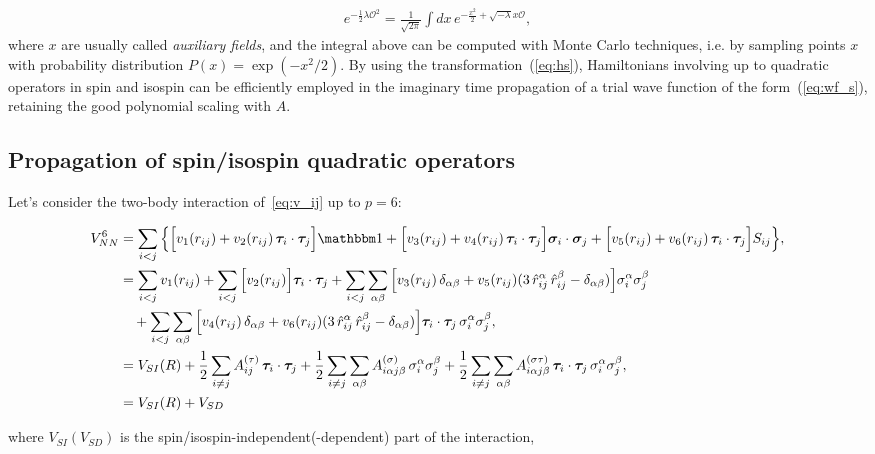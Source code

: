 \documentclass[aps,prc,twocolumn,superscriptaddress,floatfix]{revtex4-1}
\begin{document}
\begin{align}
e^{-\frac{1}{2}\lambda \mathcal O^2}=\frac{1}{\sqrt{2\pi}}\int dx\, e^{-\frac{x^2}{2}+\sqrt{-\lambda}x\mathcal O} ,
\label{eq:hs}
\end{align}
where $x$ are usually called \emph{auxiliary fields}, and the integral above can
be computed with Monte Carlo techniques, i.e. by sampling points $x$ with  
probability distribution $P(x)=\exp(-x^2/2)$. By using the transformation~(\ref{eq:hs}),
Hamiltonians involving up to quadratic operators in spin and isospin can be efficiently
employed in the imaginary time propagation of a trial wave function of the form~(\ref{eq:wf_s}),
retaining the good polynomial scaling with $A$.

\subsection{Propagation of spin/isospin quadratic operators}
\label{sec:p2}
Let's consider the two-body interaction of~\cref{eq:v_ij} up to $p=6$:
\begin{widetext}
\begin{align}
V_{NN}^6&=\sum_{i<j}\Big\{	
 \Big[v_1(r_{ij})+v_2(r_{ij})\,\bm\tau_i\cdot\bm\tau_j\Big]\mathbbm1
+\Big[v_3(r_{ij})+v_4(r_{ij})\,\bm\tau_i\cdot\bm\tau_j\Big]\bm\sigma_i\cdot\bm\sigma_j
+\Big[v_5(r_{ij})+v_6(r_{ij})\,\bm\tau_i\cdot\bm\tau_j\Big]S_{ij}\Big\} , \nonumber \\
&=\sum_{i<j}v_1(r_{ij})+\sum_{i<j}\Big[v_2(r_{ij})\Big]\bm\tau_i\cdot\bm\tau_j
+\sum_{i<j}\sum_{\alpha\beta}\Big[v_3(r_{ij})\,\delta_{\alpha\beta}
+v_5(r_{ij})(3\,\hat{r}_{ij}^\alpha\,\hat{r}_{ij}^\beta-\delta_{\alpha\beta})\Big]\sigma_i^\alpha\sigma_j^\beta \nonumber \\ 
&\quad+\sum_{i<j}\sum_{\alpha\beta}\Big[v_4(r_{ij})\,\delta_{\alpha\beta}
+v_6(r_{ij})(3\,\hat{r}_{ij}^\alpha\,\hat{r}_{ij}^\beta-\delta_{\alpha\beta})\Big]\bm\tau_i\cdot\bm\tau_j\,\sigma_i^\alpha\sigma_j^\beta , \nonumber \\
&=V_{SI}(R)+{1\over2}\sum_{i\ne j}A^{(\tau)}_{ij}\,\bm\tau_i\cdot\bm\tau_j
+{1\over2}\sum_{i\ne j}\sum_{\alpha\beta}A^{(\sigma)}_{i\alpha j\beta}\,\sigma_i^{\alpha}\sigma_j^{\beta}
+{1\over2}\sum_{i\ne j}\sum_{\alpha\beta}A^{(\sigma\tau)}_{i\alpha j\beta} \,\bm\tau_i\cdot\bm\tau_j\,\sigma_i^{\alpha}\sigma_j^{\beta} , \nonumber \\
&=V_{SI}(R)+V_{SD} \, \label{eq:v_si+sd}
\end{align}
\end{widetext}
where $V_{SI}(V_{SD})$ is the spin/isospin-independent(-dependent) part of the interaction, 
\end{document}
